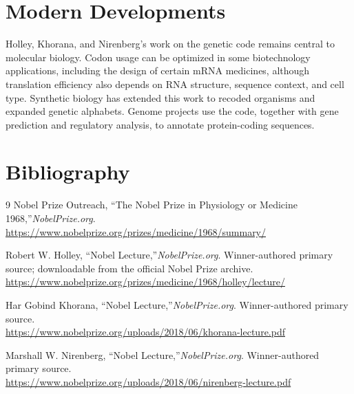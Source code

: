\section{Modern Developments}

Holley, Khorana, and Nirenberg's work on the genetic code remains central to molecular biology. Codon usage can be optimized in some biotechnology applications, including the design of certain mRNA medicines, although translation efficiency also depends on RNA structure, sequence context, and cell type. Synthetic biology has extended this work to recoded organisms and expanded genetic alphabets. Genome projects use the code, together with gene prediction and regulatory analysis, to annotate protein-coding sequences.


\section{Bibliography}

\begin{thebibliography}{9}
Nobel Prize Outreach, ``The Nobel Prize in Physiology or Medicine 1968,''\emph{NobelPrize.org}.\\
\url{https://www.nobelprize.org/prizes/medicine/1968/summary/}

Robert W. Holley, ``Nobel Lecture,''\emph{NobelPrize.org}. Winner-authored primary source; downloadable from the official Nobel Prize archive.\\
\url{https://www.nobelprize.org/prizes/medicine/1968/holley/lecture/}

Har Gobind Khorana, ``Nobel Lecture,''\emph{NobelPrize.org}. Winner-authored primary source.\\
\url{https://www.nobelprize.org/uploads/2018/06/khorana-lecture.pdf}

Marshall W. Nirenberg, ``Nobel Lecture,''\emph{NobelPrize.org}. Winner-authored primary source.\\
\url{https://www.nobelprize.org/uploads/2018/06/nirenberg-lecture.pdf}
\end{thebibliography}
